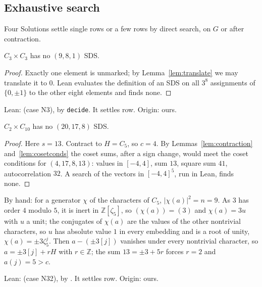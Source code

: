 \subsection{Exhaustive search}

Four Solutions settle single rows or a few rows by direct search, on $G$ or after contraction.

\begin{theorem}\label{thm:z1}
$C_3 \times C_3$ has no $(9, 8, 1)$ SDS.
\end{theorem}

\begin{proof}
Exactly one element is unmarked; by Lemma~\ref{lem:translate} we may translate it to $0$.
Lean evaluates the definition of an SDS on all $3^8$ assignments of $\{0, \pm1\}$ to the other
eight elements and finds none.
\end{proof}

\begin{remark}
Lean:  (case N3), by \texttt{decide}. It settles  row.
Origin: ours.
\end{remark}

\begin{theorem}\label{thm:z2}
$C_2 \times C_{10}$ has no $(20, 17, 8)$ SDS.
\end{theorem}

\begin{proof}
Here $s = 13$. Contract to $H = C_5$, so $c = 4$. By Lemmas~\ref{lem:contraction}
and~\ref{lem:cosetconds} the coset sums, after a sign change, would meet the coset conditions
for $(4, 17, 8, 13)$: values in $[-4, 4]$, sum $13$, square sum $41$, autocorrelation $32$.
A search of the vectors in $[-4, 4]^5$, run in Lean, finds none.
\end{proof}

\noindent By hand: for a generator $\chi$ of the characters of $C_5$, $|\chi(a)|^2 = n = 9$.
As $3$ has order $4$ modulo $5$, it is inert in $\mathbb{Z}[\zeta_5]$, so
$(\chi(a)) = (3)$ and $\chi(a) = 3u$ with $u$ a unit; the conjugates of $\chi(a)$ are the
values of the other nontrivial characters, so $u$ has absolute value $1$ in every embedding
and is a root of unity, $\chi(a) = \pm 3\zeta_5^j$. Then $a - (\pm 3[j])$ vanishes under every nontrivial
character, so $a = \pm 3[j] + rH$ with $r \in \mathbb{Z}$; the sum $13 = \pm 3 + 5r$ forces
$r = 2$ and $a(j) = 5 > c$.

\begin{remark}
Lean:  (case N32), by . It settles
 row. Origin: ours.
\end{remark}


